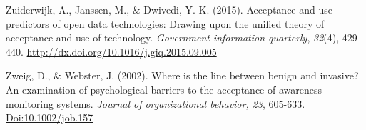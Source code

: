 \documentclass[
  12pt,
]{scrbook}
\begin{document}
Zuiderwijk, A., Janssen, M., \& Dwivedi, Y. K. (2015). Acceptance and use
predictors of open data technologies: Drawing upon the unified theory of
acceptance and use of technology. \emph{Government information quarterly},
\emph{32}(4), 429-440. \url{http://dx.doi.org/10.1016/j.giq.2015.09.005}

Zweig, D., \& Webster, J. (2002). Where is the line between benign and
invasive? An examination of psychological barriers to the acceptance of
awareness monitoring systems. \emph{Journal of organizational behavior, 23},
605-633. \url{Doi:10.1002/job.157}
\end{document}
